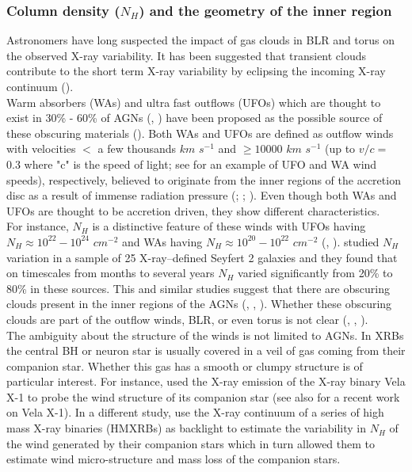 \documentclass{aa}
\begin{document}
\subsubsection{Column density ($N_H$) and the geometry of the inner region}
\label{subsubsec:NH_geometry}
Astronomers have long suspected the impact of gas clouds in BLR and torus on the observed X-ray variability. It has been suggested that transient clouds contribute to the short term X-ray variability by eclipsing the incoming X-ray continuum (\citealt{Pietrini2024}).\\
Warm absorbers (WAs) and ultra fast outflows (UFOs) which are thought to exist in 30\% - 60\%  of AGNs (\citealt{Tombesi2010}, \citealt{Igo2020}) have been proposed as the possible source of these obscuring materials (\citealt{Risaliti2002}). Both WAs and UFOs are defined as outflow winds with velocities $<$ a few thousands $km$ $s^{-1}$ and $\ge 10000$ $km$ $s^{-1}$ (up to $v/c = $ 0.3 where "c" is the speed of light; see \citealt{Taylor2025} for an example of UFO and WA wind speeds), respectively, believed to originate from the inner regions of the accretion disc as a result of immense radiation pressure (\citealt{Tombesi2010}; \citealt{Igo2020}; \citealt{Hu2026}). Even though both WAs and UFOs are thought to be accretion driven, they show different characteristics. \\
For instance, $N_H$ is a distinctive feature of these winds with UFOs having $N_H \approx 10^{22} - 10 ^{24}$ $cm^{-2}$ and WAs having $N_H \approx 10^{20} - 10 ^{22}$ $cm^{-2}$ (\citealt{Risaliti2002}, \citealt{Tombesi2010}). \citet{Risaliti2011} studied $N_H$ variation in a sample of 25 X-ray–defined Seyfert 2 galaxies and they found that on timescales from months to several years $N_H$ varied significantly from 20\% to 80\% in these sources. This and similar studies suggest that there are obscuring clouds present in the inner regions of the AGNs (\citealt{Risaliti2002}, \citealt{Maiolino2010}, \citealt{Risaliti2011}). Whether these obscuring clouds are part of the outflow winds, BLR, or even torus is not clear (\citealt{Lamer2003}, \citealt{Mizumoto2019}, \citealt{Fukumura2024}). \\
The ambiguity about the structure of the winds is not limited to AGNs. In XRBs the central BH or neuron star is usually covered in a veil of gas coming from their companion star. Whether this gas has a smooth or clumpy structure is of particular interest. For instance, \citet{Kretschmar2021} used the X-ray emission of the X-ray binary Vela X-1 to probe the wind structure of its companion star (see also \citealt{Abalo2024} for a recent work on Vela X-1). In a different study, \citet{Mellah2020} use the X-ray continuum of a series of high mass X-ray binaries (HMXRBs) as backlight to estimate the variability in $N_H$ of the wind generated by their companion stars which in turn allowed them to estimate wind micro-structure and mass loss of the companion stars. \\
\end{document}
